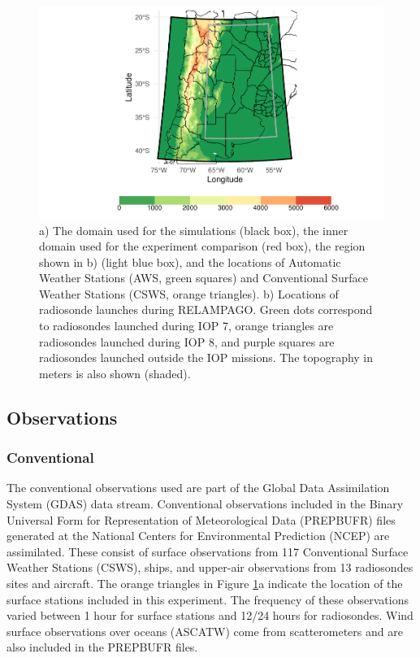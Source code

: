 \documentclass[final,5p,times,twocolumn,authoryear]{elsarticle} %
\begin{document}
\begin{figure}
\includegraphics[width=0.98\linewidth]{../figures/dominio-1} \caption{a) The domain used for the simulations (black box), the inner domain used for the experiment comparison (red box), the region shown in b) (light blue box), and the locations of Automatic Weather Stations (AWS, green squares) and Conventional Surface Weather Stations (CSWS, orange triangles). b) Locations of radiosonde launches during RELAMPAGO. Green dots correspond to radiosondes launched during IOP 7, orange triangles are radiosondes launched during IOP 8, and purple squares are radiosondes launched outside the IOP missions. The topography in meters is also shown (shaded).}\label{fig:dominio}
\end{figure}

\hypertarget{observations}{%
\subsection{Observations}\label{observations}}

\hypertarget{conventional}{%
\subsubsection{Conventional}\label{conventional}}

The conventional observations used are part of the Global Data Assimilation System (GDAS) data stream. Conventional observations included in the Binary Universal Form for Representation of Meteorological Data (PREPBUFR) files generated at the National Centers for Environmental Prediction (NCEP) are assimilated. These consist of surface observations from 117 Conventional Surface Weather Stations (CSWS), ships, and upper-air observations from 13 radiosondes sites and aircraft. The orange triangles in Figure \ref{fig:dominio}a indicate the location of the surface stations included in this experiment. The frequency of these observations varied between 1 hour for surface stations and 12/24 hours for radiosondes. Wind surface observations over oceans (ASCATW) come from scatterometers and are also included in the PREPBUFR files.
\end{document}
